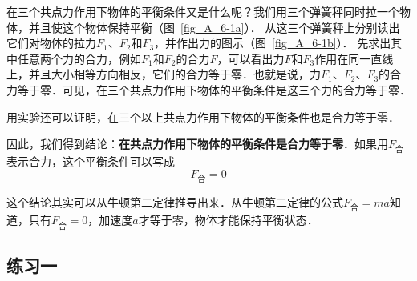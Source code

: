 在三个共点力作用下物体的平衡条件又是什么呢？我们用三个弹簧秤同时拉一个物体，并且使这个物体保持平衡（图~\ref{fig_A_6-1a}）．
从这三个弹簧秤上分别读出它们对物体的拉力$F_1$、$F_2$和$F_3$，并作出力的图示（图~\ref{fig_A_6-1b}）．
先求出其中任意两个力的合力，例如$F_1$和$F_2$的合力$F$，可以看出力$F$和$F_3$作用在同一直线上，并且大小相等方向相反，它们的合力等于零．也就是说，力$F_1$、$F_2$、$F_3$的合力等于零．可见，在三个共点力作用下物体的平衡条件是这三个力的合力等于零．

用实验还可以证明，在三个以上共点力作用下物体的平衡条件也是合力等于零．

因此，我们得到结论：\textbf{在共点力作用下物体的平衡条件是合力等于零}．如果用$F_{\text{合}}$表示合力，这个平衡条件可以写成
\[F_{\text{合}}=0\] 

这个结论其实可以从牛顿第二定律推导出来．从牛顿第二定律的公式$F_{\text{合}}=ma$知道，只有$F_{\text{合}}=0$，加速度$a$才等于零，物体才能保持平衡状态．

\subsection*{练习一}

